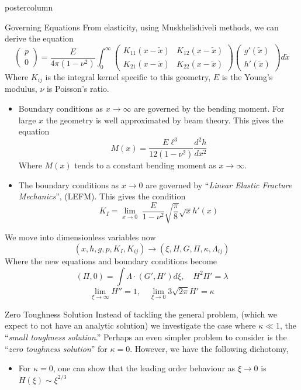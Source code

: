 \documentclass{beamer}
\begin{document}
\begin{frame}
\begin{columns}
\begin{column}{.43\textwidth}
\begin{beamercolorbox}[center]{postercolumn}
\begin{minipage}{.98\textwidth}
{\begin{myblock}{Governing Equations}
From elasticity, using Muskhelishiveli methods, we can derive the equation
\[
\left( \begin{array}{c} p \\ 0 \end{array} \right)   =
\frac{E}{4\pi (1-\nu^2)} \int_0^{\infty}
\left(\begin{array}{cc} K_{11}(x-\tilde{x}) & K_{12}(x-\tilde{x}) \\ 
K_{21}(x-\tilde{x}) & K_{22}(x-\tilde{x}) \end{array} \right)
\left( \begin{array}{c} g'(\tilde{x}) \\ h'(\tilde{x}) \end{array} 
\right)d\tilde{x}  \]
Where $K_{ij}$ is the integral kernel specific to this geometry, $E$ is the
Young's modulus, $\nu$ is Poisson's ratio. 
\begin{itemize}
\item Boundary conditions as $x\to\infty$ are governed by the bending moment.
      For large $x$ the geometry is well approximated by beam theory. This 
      gives the equation 
      \[ M(x) = \frac{E\ell^3}{12(1-\nu^2)}\frac{d^2h}{dx^2} \]
      Where $M(x)$ tends to a constant bending moment as $x\to \infty$.
\item The boundary conditions as $x\to0$ are governed by ``\emph{Linear Elastic
      Fracture Mechanics}'', (LEFM). This gives the condition
      \[K_I = \lim_{x\to 0} \; \frac{E}{1-\nu^2}\sqrt{\frac{\pi}{8}} \sqrt{x}
      h'(x) \]
\end{itemize}
We move into dimensionless variables now
\[(x,h,g,p,K_I,K_{ij}) \to (\xi, H,G,\Pi, \kappa, \Lambda_{ij}) \]
Where the new equations and boundary conditions become
\[(\Pi,0) = \int \Lambda \cdot (G',H') d\xi, \quad H^2\Pi' = \lambda\]
\[\lim_{\xi \to \infty} H'' = 1, \quad \lim_{\xi \to 0} 3\sqrt{2\pi}H' 
= \kappa \]
\end{myblock}\vfill
\begin{myblock}{Zero Toughness Solution}
Instead of tackling the general problem, (which we expect to not have an
analytic solution) we investigate the case where $\kappa \ll 1$,
the ``\emph{small toughness solution}.'' Perhaps an even simpler problem to 
consider is the ``\emph{zero toughness solution}'' for $\kappa=0$. 
However, we have the following dichotomy,
\begin{itemize}
\item For $\kappa=0$, one can show that the leading order behaviour
      as $\xi\to 0$ is $H(\xi) \sim \xi^{2/3}$

\end{itemize}
\end{myblock}}
\end{minipage}
\end{beamercolorbox}
\end{column}
\end{columns}
\end{frame}
\end{document}
